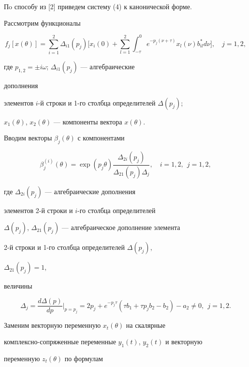 Пo способу из [2] приведем систему (4) к канонической форме. 


Рассмотрим функционалы 


$$ 


f_j[x(\theta)]=\sum^2_{i=1}\Delta_{i1}(p_j)\bigg[x_i(0)+ 


\sum^2_{l=1}\int^0_{-\tau}e^{-p_j(\nu+\tau)} 


x_l(\nu)b^*_{i l}d\nu\bigg],\quad j=1,2, 


$$ 


где $p_{1,2}=\pm i\omega$; $\Delta_{i1}(p_j)$ --- алгебраические 


дополнения 


элементов $i$-й строки и 1-го столбца определителей $\Delta(p_j)$; 


$x_1(\theta)$, $x_2(\theta)$ --- компоненты вектора $x(\theta)$. 


 


Вводим векторы $\beta_j(\theta)$ с компонентами 


$$ 


\beta^{(i)}_j(\theta)=\exp(p_j \theta) 


\frac{\Delta_{2i}(p_j)}{\Delta_{21}(p_j)\Delta_j},\quad 


i=1,2,\ \ j=1,2, 


$$ 


где $\Delta_{2i}(p_j)$ --- алгебраические дополнения 


элементов 2-й строки и $i$-го столбца определителей 


$\Delta(p_j)$, $\Delta_{21}(p_j)$ --- алгебраическое дополнение элемента 


2-й строки и 1-го столбца определителей $\Delta(p_j)$, 


$\Delta_{21}(p_j)=1$, 


величины 


$$ 


\Delta_j=\frac{d\Delta(p)}{d p}\bigg|_{p=p_j}= 


2p_j+e^{-p_j\tau}(\tau b_1+\tau p_j b_2-b_2)-a_2\ne0, 


\ \ j=1,2. 


$$ 


 


Заменим векторную переменную $x_t(\theta)$ на скалярные 


комплексно-сопряженные переменные $y_1(t)$, $y_2(t)$ и векторную 


переменную $z_t(\theta)$ по формулам 


